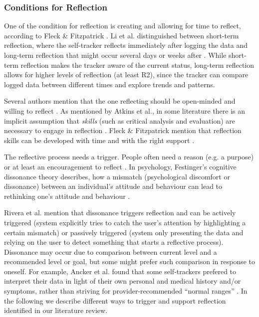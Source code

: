 \subsubsection{Conditions for Reflection}
One of the condition for reflection is creating and allowing for time to reflect, according to Fleck \& Fitzpatrick \cite{Fleck}. Li et al. distinguished between short-term reflection, where the self-tracker reflects immediately after logging the data and long-term reflection that might occur several days or weeks after \cite{Li2010}. While short-term reflection makes the tracker aware of the current status, long-term reflection allows for higher levels of reflection (at least R2), since the tracker can compare logged data between different times and explore trends and patterns. 

Several authors mention that the one reflecting should be open-minded and willing to reflect \cite{Atkins, Rogers}. As mentioned by Atkins et al., in some literature there is an implicit assumption that \textit{skills} (such as critical analysis and evaluation) are necessary to engage in reflection \cite{Atkins, Rogers}. Fleck \& Fitzpatrick mention that reflection skills can be developed with time and with the right support \cite{Fleck}.

The reflective process needs a trigger. People often need a reason (e.g. a purpose) or at least an encouragement to reflect \cite{Fleck, Mols}. In psychology, Festinger’s cognitive dissonance theory describes, how a mismatch (psychological discomfort or dissonance) between an individual's attitude and behaviour can lead to rethinking one’s attitude and behaviour \cite{Rivera}. 

Rivera et al. mention that dissonance triggers reflection and can be actively triggered (system explicitly tries to catch the user’s attention by highlighting a certain mismatch) or passively triggered (system only presenting the data and relying on the user to detect something that starts a reflective process). Dissonance may occur due to comparison between current level and a recommended level or goal, but some might prefer such comparison in response to oneself. For example, Ancker et al. found that some self-trackers prefered to interpret their data in light of their own personal and medical history and/or symptoms, rather than striving for provider-recommended “normal ranges” \cite{Ancker2015}. In the following we describe different ways to trigger and support reflection identified in our literature review. 

